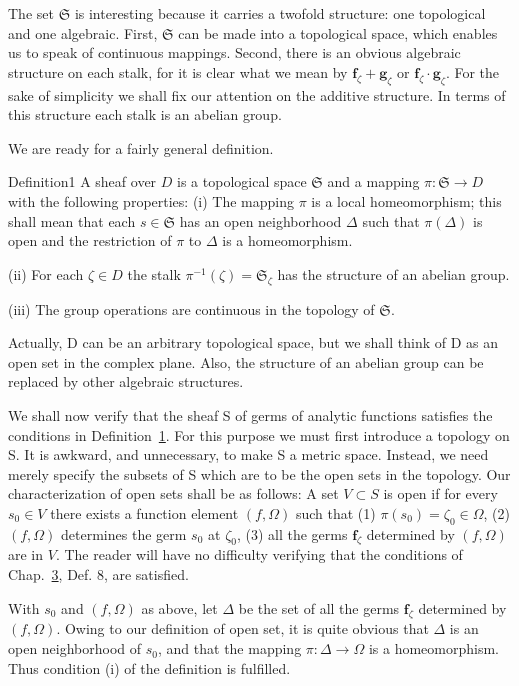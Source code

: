 The set $\mathfrak{S}$ is interesting because it carries a twofold structure: one topological and one algebraic. First, $\mathfrak{S}$ can be made into a topological space, which enables us to speak of continuous mappings. Second, there is an obvious algebraic structure on each stalk, for it is clear what we mean by $\mathbf{f}_{\zeta} + \mathbf{g}_{\zeta}$ or $\mathbf{f}_{\zeta} \cdot \mathbf{g}_{\zeta}$. For the sake of simplicity we shall fix our attention on the additive structure. In terms of this structure each stalk is an abelian group.

We are ready for a fairly general definition.

\begin{originalstatement}{Definition}{1}\label{def:8.1}
A sheaf over $D$ is a topological space $\mathfrak{S}$ and a mapping $\pi\colon\mathfrak{S}\to D$ with the following properties:
(i) The mapping $\pi$ is a local homeomorphism; this shall mean that each $s \in \mathfrak{S}$ has an open neighborhood $\Delta$ such that $\pi(\Delta)$ is open and the restriction of $\pi$ to $\Delta$ is a homeomorphism.

(ii) For each $\zeta \in D$ the stalk $\pi^{-1}(\zeta) = \mathfrak{S}_{\zeta}$ has the structure of an abelian group.

(iii) The group operations are continuous in the topology of $\mathfrak{S}$.
\end{originalstatement}

Actually, D can be an arbitrary topological space, but we shall think of D as an open set in the complex plane. Also, the structure of an abelian group can be replaced by other algebraic structures.

We shall now verify that the sheaf S of germs of analytic functions satisfies the conditions in Definition~\hyperref[def:8.1]{1}. For this purpose we must first introduce a topology on S. It is awkward, and unnecessary, to make S a metric space. Instead, we need merely specify the subsets of S which are to be the open sets in the topology. Our characterization of open sets shall be as follows: A set $V \subset S$ is open if for every $s_{0} \in V$ there exists a function element $(f,\Omega)$ such that (1) $\pi(s_{0}) = \zeta_{0} \in \Omega$, (2) $(f,\Omega)$ determines the germ $s_{0}$ at $\zeta_{0}$, (3) all the germs $\mathbf{f}_{\zeta}$ determined by $(f,\Omega)$ are in $V$. The reader will have no difficulty verifying that the conditions of Chap.~\hyperref[chap:3]{3}, Def. 8, are satisfied.

With $s_0$ and $(f, \Omega)$ as above, let $\Delta$ be the set of all the germs $\mathbf{f}_{\zeta}$ determined by $(f, \Omega)$. Owing to our definition of open set, it is quite obvious that $\Delta$ is an open neighborhood of $s_0$, and that the mapping $\pi: \Delta \to \Omega$ is a homeomorphism. Thus condition (i) of the definition is fulfilled.


